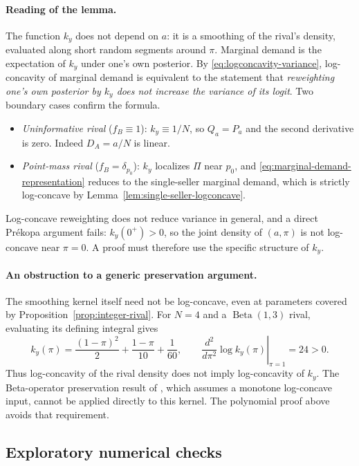 \documentclass[11pt]{article}
\DeclareMathOperator{\Beta}{Beta}
\theoremstyle{definition}
\begin{document}
\paragraph{Reading of the lemma.}
The function $k_y$ does not depend on $a$: it is a smoothing of the rival's
density, evaluated along short random segments around $\pi$. Marginal
demand is the expectation of $k_y$ under one's own posterior. By
\eqref{eq:logconcavity-variance}, log-concavity of marginal demand is
equivalent to the statement that \emph{reweighting one's own posterior by
$k_y$ does not increase the variance of its logit}. Two boundary cases
confirm the formula.
\begin{itemize}
\item \emph{Uninformative rival} ($f_B\equiv1$): $k_y\equiv1/N$, so
$Q_a=P_a$ and the second derivative is zero. Indeed $D_A=a/N$ is linear.
\item \emph{Point-mass rival} ($f_B=\delta_{p_0}$): $k_y$ localizes $\Pi$
near $p_0$, and \eqref{eq:marginal-demand-representation} reduces to the
single-seller marginal demand, which is strictly log-concave by
Lemma~\ref{lem:single-seller-logconcave}.
\end{itemize}
Log-concave reweighting does not reduce variance in general, and a direct
Pr\'ekopa argument fails: $k_y(0^+)>0$, so the joint density of
$(a,\pi)$ is not log-concave near $\pi=0$. A proof must therefore use the
specific structure of $k_y$.

\paragraph{An obstruction to a generic preservation argument.}
The smoothing kernel itself need not be log-concave, even at parameters
covered by Proposition~\ref{prop:integer-rival}. For $N=4$ and a
$\Beta(1,3)$ rival, evaluating its defining integral gives
\begin{equation*}
k_y(\pi)=\frac{(1-\pi)^2}{2}+\frac{1-\pi}{10}+\frac1{60},
\qquad
\left.\frac{d^2}{d\pi^2}\log k_y(\pi)\right|_{\pi=1}=24>0.
\end{equation*}
Thus log-concavity of the rival density does not imply log-concavity of
$k_y$. The Beta-operator preservation result of \cite{badia2023}, which
assumes a monotone log-concave input, cannot be applied directly to this
kernel. The polynomial proof above avoids that requirement.

\subsection{Exploratory numerical checks}\label{app:demand-numerics}
\end{document}
